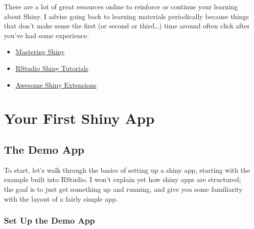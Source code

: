 \documentclass[
  oneside]{book}
\providecommand{\tightlist}{%
  \setlength{\itemsep}{0pt}\setlength{\parskip}{0pt}}
\begin{document}
There are a lot of great resources online to reinforce or continue your learning about Shiny. I advise going back to learning materials periodically because things that don't make sense the first (or second or third\ldots) time around often click after you've had some experience.

\begin{itemize}
\tightlist
\item
  \href{https://mastering-shiny.org/}{Mastering Shiny}
\item
  \href{https://shiny.rstudio.com/tutorial/}{RStudio Shiny Tutorials}
\item
  \href{https://github.com/nanxstats/awesome-shiny-extensions}{Awesome Shiny Extensions}
\end{itemize}

\hypertarget{first-app}{%
\chapter{Your First Shiny App}\label{first-app}}

\hypertarget{the-demo-app}{%
\section{The Demo App}\label{the-demo-app}}

To start, let's walk through the basics of setting up a shiny app, starting with the example built into RStudio. I won't explain yet how shiny apps are structured; the goal is to just get something up and running, and give you some familiarity with the layout of a fairly simple app.

\hypertarget{set-up-the-demo-app}{%
\subsection{Set Up the Demo App}\label{set-up-the-demo-app}}
\end{document}
